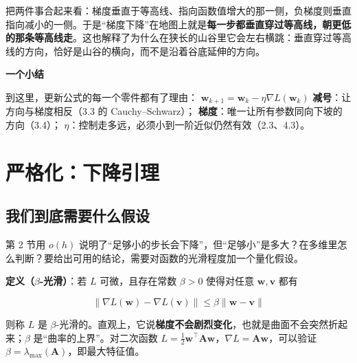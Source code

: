 \documentclass[UTF8, a4paper, zihao=-4, fontset=none]{ctexart}
\begin{document}
把两件事合起来看：梯度垂直于等高线、指向函数值增大的那一侧，负梯度则垂直指向减小的一侧。于是“梯度下降”在地图上就是\textbf{每一步都垂直穿过等高线，朝更低的那条等高线走}。这也解释了为什么在狭长的山谷里它会左右横跳：垂直穿过等高线的方向，恰好是山谷的横向，而不是沿着谷底延伸的方向。



\begin{infobox}
{\bfseries\sffamily\small\color{accent} 一个小结}\par\vspace{2pt}
到这里，更新公式的每一个零件都有了理由：\newline 
  $\mathbf{w}_{k+1}=\mathbf{w}_k-\eta\nabla L(\mathbf{w}_k)$\newline 
\textbf{减号}：让方向与梯度相反（3.3 的 Cauchy–Schwarz）；\newline 
\textbf{梯度}：唯一让所有参数同向下坡的方向（3.4）；\newline 
\textbf{$\eta$}：控制走多远，必须小到一阶近似仍然有效（2.3、4.3）。


\end{infobox}




\section{严格化：下降引理}




\subsection{我们到底需要什么假设}



第 2 节用 $o(h)$ 说明了“足够小的步长会下降”，但“足够小”是多大？在多维里怎么判断？要给出可用的结论，需要对函数的光滑程度加一个量化假设。



\textbf{定义（$\beta$-光滑）}：若 $L$ 可微，且存在常数 $\beta>0$ 使得对任意 $\mathbf{w},\mathbf{v}$ 都有


\[
\|\nabla L(\mathbf{w})-\nabla L(\mathbf{v})\|\le\beta\|\mathbf{w}-\mathbf{v}\|
\]


则称 $L$ 是 $\beta$-光滑的。直观上，它说\textbf{梯度不会剧烈变化}，也就是曲面不会突然折起来；$\beta$ 是“曲率的上界”。对二次函数 $L=\frac12\mathbf{w}^\top\mathbf{A}\mathbf{w}$，$\nabla L=\mathbf{A}\mathbf{w}$，可以验证 $\beta=\lambda_{\max}(\mathbf{A})$，即最大特征值。
\end{document}
